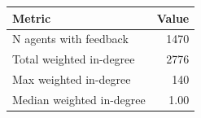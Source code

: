 \begin{tabular}{lr}\hline
Metric & Value \\ \hline
N agents with feedback & 1470 \\ 
Total weighted in-degree & 2776 \\ 
Max weighted in-degree & 140 \\ 
Median weighted in-degree & 1.00 \\ 
\hline\end{tabular}
